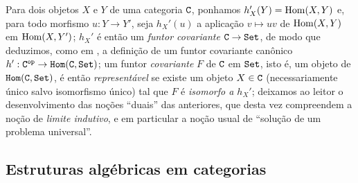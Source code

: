 \begin{env}[8.1.11]
\label{0.8.1.11}
Para dois objetos $X$ e $Y$ de uma categoria $\mathtt{C}$, ponhamos $h_X'(Y)=\operatorname{Hom}(X,Y)$ e, para todo morfismo $u:Y\to Y'$, seja $h_X'(u)$ a aplicação $v\mapsto uv$ de $\operatorname{Hom}(X,Y)$ em $\operatorname{Hom}(X,Y')$; $h_X'$ é então um \emph{funtor covariante $\C\to\Set$}, de modo que deduzimos, como em , a definição de um funtor covariante canônico $h':\C\op\to\CHom(\C,\Set)$; um funtor \emph{covariante} $F$ de $\mathtt{C}$ em $\mathtt{Set}$, isto é, um objeto de $\mathtt{Hom}(\mathtt{C},\mathtt{Set})$, é então \emph{representável} se existe um objeto $X\in\mathtt{C}$ (necessariamente único salvo isomorfismo único) tal que $F$ é \emph{isomorfo a $h_X'$}; deixamos ao leitor o desenvolvimento das noções ``duais'' das anteriores, que desta vez compreendem a noção de \emph{limite indutivo}, e em particular a noção usual de ``solução de um problema universal''.
\end{env}

\subsection{Estruturas algébricas em categorias}
\label{subsection:0.8.2}

